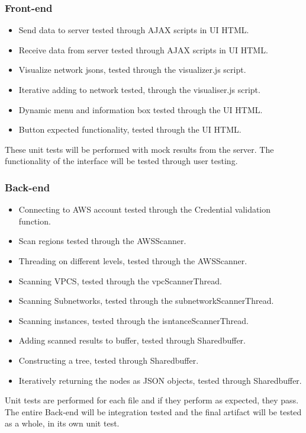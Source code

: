 \documentclass[hidelinks,a4paper,12pt]{article}
\begin{document}
\subsubsection{Front-end}
\begin{itemize}
  \item Send data to server tested through AJAX scripts in UI HTML.
  \item Receive data from server tested through AJAX scripts in UI HTML.
  \item Visualize network jsons, tested through the visualizer.js script.
  \item Iterative adding to network tested, through the visualiser.js script.
  \item Dynamic menu and information box tested through the UI HTML.
  \item Button expected functionality, tested through the UI HTML. 
\end{itemize}
These unit tests will be performed with mock results from the server. The functionality of the interface will be tested through user testing.

\subsubsection{Back-end}
\begin{itemize}
  \item Connecting to AWS account tested through the Credential validation function.
  \item Scan regions tested through the AWSScanner.
  \item Threading on different levels, tested through the AWSScanner.
  \item Scanning VPCS,  tested through the vpcScannerThread.
   \item Scanning Subnetworks,  tested through the subnetworkScannerThread.
    \item Scanning instances, tested through the isntanceScannerThread.
  \item Adding scanned results to buffer, tested through Sharedbuffer.
\item Constructing a tree, tested through Sharedbuffer.
  \item Iteratively returning the nodes as JSON objects, tested through Sharedbuffer.
\end{itemize}
Unit tests are performed for each file and if they perform as expected, they pass. The entire Back-end will be  integration tested and the final artifact will be tested as a whole, in its own unit test.
\end{document}
